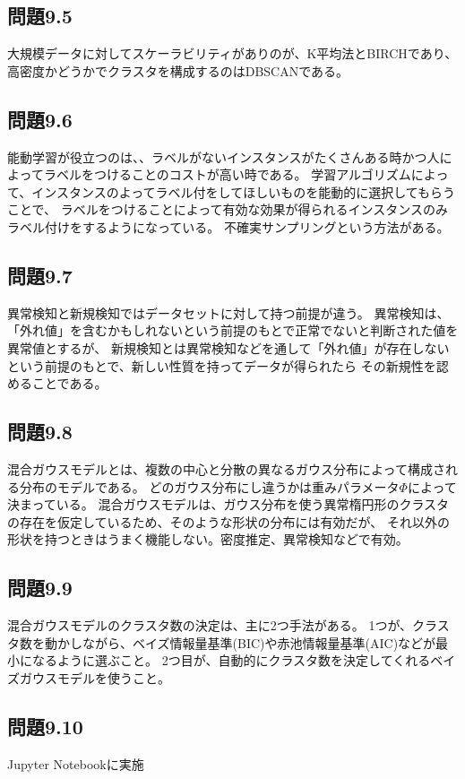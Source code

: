 \documentclass[a4j,twocolumn]{jsarticle}
\begin{document}
\subsection{問題9.5}
大規模データに対してスケーラビリティがありのが、K平均法とBIRCHであり、
高密度かどうかでクラスタを構成するのはDBSCANである。

\subsection{問題9.6}
能動学習が役立つのは、、ラベルがないインスタンスがたくさんある時かつ人によってラベルをつけることのコストが高い時である。
学習アルゴリズムによって、インスタンスのよってラベル付をしてほしいものを能動的に選択してもらうことで、
ラベルをつけることによって有効な効果が得られるインスタンスのみラベル付けをするようになっている。
不確実サンプリングという方法がある。

\subsection{問題9.7}
異常検知と新規検知ではデータセットに対して持つ前提が違う。
異常検知は、「外れ値」を含むかもしれないという前提のもとで正常でないと判断された値を異常値とするが、
新規検知とは異常検知などを通して「外れ値」が存在しないという前提のもとで、新しい性質を持ってデータが得られたら
その新規性を認めることである。

\subsection{問題9.8}
混合ガウスモデルとは、複数の中心と分散の異なるガウス分布によって構成される分布のモデルである。
どのガウス分布にし違うかは重みパラメータ$\Phi$によって決まっている。
混合ガウスモデルは、ガウス分布を使う異常楕円形のクラスタの存在を仮定しているため、そのような形状の分布には有効だが、
それ以外の形状を持つときはうまく機能しない。密度推定、異常検知などで有効。

\subsection{問題9.9}
混合ガウスモデルのクラスタ数の決定は、主に2つ手法がある。
1つが、クラスタ数を動かしながら、ベイズ情報量基準(BIC)や赤池情報量基準(AIC)などが最小になるように選ぶこと。
2つ目が、自動的にクラスタ数を決定してくれるベイズガウスモデルを使うこと。

\subsection{問題9.10}
Jupyter Notebookに実施
\end{document}

